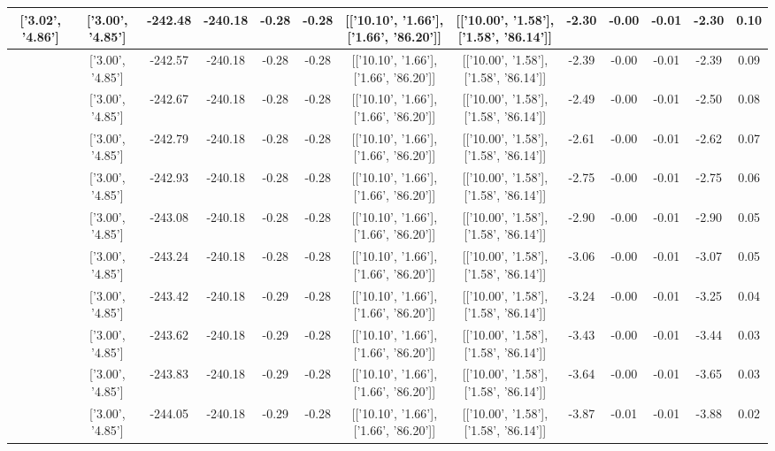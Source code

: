 \begin{table}[htbp]
\begin{adjustbox}{angle=90}
\begin{tabular}{|c|c|c|c|c|c|c|c|c|c|c|c|c|}
 ['3.02', '4.86'] & ['3.00', '4.85'] & -242.48 & -240.18 & -0.28 & -0.28 & [['10.10', '1.66'], ['1.66', '86.20']] & [['10.00', '1.58'], ['1.58', '86.14']] & -2.30 & -0.00 & -0.01 & -2.30 & 0.10\\ \hline
 ['3.02', '4.86'] & ['3.00', '4.85'] & -242.57 & -240.18 & -0.28 & -0.28 & [['10.10', '1.66'], ['1.66', '86.20']] & [['10.00', '1.58'], ['1.58', '86.14']] & -2.39 & -0.00 & -0.01 & -2.39 & 0.09\\ \hline
 ['3.03', '4.86'] & ['3.00', '4.85'] & -242.67 & -240.18 & -0.28 & -0.28 & [['10.10', '1.66'], ['1.66', '86.20']] & [['10.00', '1.58'], ['1.58', '86.14']] & -2.49 & -0.00 & -0.01 & -2.50 & 0.08\\ \hline
 ['3.03', '4.86'] & ['3.00', '4.85'] & -242.79 & -240.18 & -0.28 & -0.28 & [['10.10', '1.66'], ['1.66', '86.20']] & [['10.00', '1.58'], ['1.58', '86.14']] & -2.61 & -0.00 & -0.01 & -2.62 & 0.07\\ \hline
 ['3.04', '4.86'] & ['3.00', '4.85'] & -242.93 & -240.18 & -0.28 & -0.28 & [['10.10', '1.66'], ['1.66', '86.20']] & [['10.00', '1.58'], ['1.58', '86.14']] & -2.75 & -0.00 & -0.01 & -2.75 & 0.06\\ \hline
 ['3.04', '4.86'] & ['3.00', '4.85'] & -243.08 & -240.18 & -0.28 & -0.28 & [['10.10', '1.66'], ['1.66', '86.20']] & [['10.00', '1.58'], ['1.58', '86.14']] & -2.90 & -0.00 & -0.01 & -2.90 & 0.05\\ \hline
 ['3.04', '4.86'] & ['3.00', '4.85'] & -243.24 & -240.18 & -0.28 & -0.28 & [['10.10', '1.66'], ['1.66', '86.20']] & [['10.00', '1.58'], ['1.58', '86.14']] & -3.06 & -0.00 & -0.01 & -3.07 & 0.05\\ \hline
 ['3.05', '4.86'] & ['3.00', '4.85'] & -243.42 & -240.18 & -0.29 & -0.28 & [['10.10', '1.66'], ['1.66', '86.20']] & [['10.00', '1.58'], ['1.58', '86.14']] & -3.24 & -0.00 & -0.01 & -3.25 & 0.04\\ \hline
 ['3.05', '4.86'] & ['3.00', '4.85'] & -243.62 & -240.18 & -0.29 & -0.28 & [['10.10', '1.66'], ['1.66', '86.20']] & [['10.00', '1.58'], ['1.58', '86.14']] & -3.43 & -0.00 & -0.01 & -3.44 & 0.03\\ \hline
 ['3.05', '4.86'] & ['3.00', '4.85'] & -243.83 & -240.18 & -0.29 & -0.28 & [['10.10', '1.66'], ['1.66', '86.20']] & [['10.00', '1.58'], ['1.58', '86.14']] & -3.64 & -0.00 & -0.01 & -3.65 & 0.03\\ \hline
 ['3.06', '4.86'] & ['3.00', '4.85'] & -244.05 & -240.18 & -0.29 & -0.28 & [['10.10', '1.66'], ['1.66', '86.20']] & [['10.00', '1.58'], ['1.58', '86.14']] & -3.87 & -0.01 & -0.01 & -3.88 & 0.02\\ \hline

\end{tabular}
\end{adjustbox}
\end{table}
